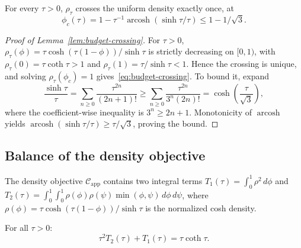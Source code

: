 \begin{lemma}
\label{lem:budget-crossing}
For every $\tau>0$, $\rho_\tau$ crosses the uniform density exactly once, at
\begin{equation}
\phi_c(\tau)=1-\tau^{-1}\operatorname{arcosh}(\sinh\tau/\tau)
\le 1-1/\sqrt3.
\label{eq:budget-crossing}
\end{equation}
\end{lemma}

\begin{proof}[Proof of Lemma~\ref{lem:budget-crossing}]
For $\tau>0$, $\rho_\tau(\phi)=\tau\cosh(\tau(1-\phi))/\sinh\tau$ is
strictly decreasing on $[0,1)$, with
$\rho_\tau(0)=\tau\coth\tau>1$ and
$\rho_\tau(1)=\tau/\sinh\tau<1$.  Hence the crossing is unique, and solving
$\rho_\tau(\phi_c)=1$ gives~\eqref{eq:budget-crossing}.  To bound it, expand
\[
\frac{\sinh\tau}{\tau}
=\sum_{n\ge0}\frac{\tau^{2n}}{(2n+1)!}
\ge \sum_{n\ge0}\frac{\tau^{2n}}{3^n(2n)!}
=\cosh\!\left(\frac{\tau}{\sqrt3}\right),
\]
where the coefficient-wise inequality is $3^n\ge2n+1$.  Monotonicity of
$\operatorname{arcosh}$ yields
$\operatorname{arcosh}(\sinh\tau/\tau)\ge\tau/\sqrt3$, proving the bound.
\end{proof}

\FloatBarrier
\subsection{Balance of the density objective}
\label{sec:self-consistency}

The density objective $\mathcal{C}_{\mathrm{app}}$ contains two integral terms $T_1(\tau) = \int_0^1 \rho^2\,d\phi$ and $T_2(\tau) = \int_0^1\!\!\int_0^1 \rho(\phi)\rho(\psi)\min(\phi,\psi)\,d\phi\,d\psi$, where $\rho(\phi) = \tau\cosh(\tau(1{-}\phi))/\sinh\tau$ is the normalized cosh density.

\begin{theorem}
\label{thm:self-consistency}
For all $\tau > 0$:
\begin{equation}
\tau^2 T_2(\tau) + T_1(\tau) = \tau\coth\tau.
\label{eq:self-consistency}
\end{equation}
\end{theorem}

